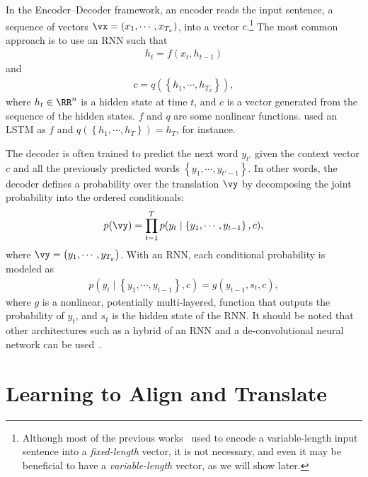 In the Encoder--Decoder framework, an encoder reads the input sentence, a
sequence of vectors $\vx=\left( x_1, \cdots, x_{T_x} \right)$, into a vector
$c$.\footnote{
    Although most of the previous works~\citep[see,
    e.g.,][]{Cho2014,Sutskever2014,Kalchbrenner2013} used to encode a
    variable-length input sentence into a {\it fixed-length} vector, it is not
    necessary, and even it may be beneficial to have a {\it variable-length}
    vector, as we will show later.
} The most common approach is to use an RNN such that  
\begin{align}
    \label{eq:forward_state}
    h_t = f\left( x_{t}, h_{t-1} \right)
\end{align}
and
\begin{align*}
    c = q\left(\left\{ h_1, \cdots, h_{T_x} \right\}\right),
\end{align*}
where $h_t \in \RR^{n}$ is a hidden state at time $t$, and $c$ is a vector
generated from the sequence of the hidden states. $f$ and $q$ are some
nonlinear functions. \citet{Sutskever2014} used an LSTM as $f$ and
$q\left(\left\{ h_1, \cdots, h_T \right\}\right)=h_T$, for instance.

The decoder is often trained to predict the next word $y_{t'}$ given the context
vector $c$ and all the previously predicted words $\left\{ y_1, \cdots, y_{t'-1}
\right\}$. In other words, the decoder defines a probability over the
translation $\vy$ by decomposing the joint probability into the ordered
conditionals:
\begin{align}
    \label{eq:decoder_prob}
    p(\vy) = \prod_{t=1}^T p(y_t \mid \left\{ y_1, \cdots, y_{t-1} \right\}, c),
\end{align}
where $\vy = \left( y_1, \cdots, y_{T_y} \right)$. With an RNN, each
conditional probability is modeled as
\begin{align}
    \label{eq:output_rnn}
    p(y_t \mid \left\{ y_1, \cdots, y_{t-1} \right\}, c) = g(y_{t-1}, s_{t}, c),
\end{align}
where $g$ is a nonlinear, potentially multi-layered, function that outputs the
probability of $y_t$, and $s_t$ is the hidden state of the RNN.  It should be
noted that other architectures such as a hybrid of an RNN and a
de-convolutional neural network can be used~\citep{Kalchbrenner2013}.

\section{Learning to Align and Translate}
\label{sec:main}

